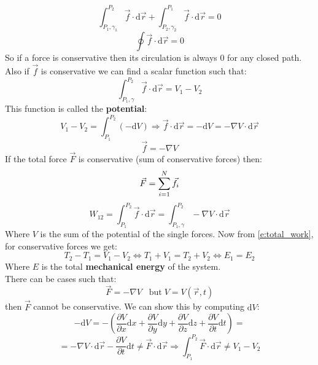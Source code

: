 \begin{equation}
    \int_{P_1,\gamma_1}^{P_2}\vec{f}\cdot\mathrm{d}\vec{r} + \int_{P_2,\gamma_2}^{P_1}\vec{f}\cdot\mathrm{d}\vec{r} = 0
\end{equation}
\begin{equation}
    \oint\vec{f}\cdot\mathrm{d}\vec{r} = 0
\end{equation}
So if a force is conservative then its circulation is always 0 for any closed path.\\
Also if $\vec{f}$ is conservative we can find a scalar function such that:
\begin{equation}
    \int_{P_1,\gamma}^{P_2}\vec{f}\cdot\mathrm{d}\vec{r} = V_1-V_2
\end{equation}
This function is called the \textbf{potential}:
\begin{equation}
    V_1-V_2 = \int_{P_1}^{P_2}(-\mathrm{d}V) \Rightarrow \vec{f}\cdot\mathrm{d}\vec{r} = -\mathrm{d}V = -\nabla V \cdot \mathrm{d}\vec{r}
\end{equation}
\begin{equation}
    \vec{f} = -\nabla V
\end{equation}
If the total force $\vec{F}$ is conservative (sum of conservative forces) then:
\begin{equation}
    \vec{F} = \displaystyle\sum_{i=1}^{N} \vec{f}_i
\end{equation}
\begin{equation}
    W_{12}=\int_{P_1}^{P_2}\vec{f}\cdot\mathrm{d}\vec{r} = \int_{P_1,\gamma}^{P_2}-\nabla V\cdot\mathrm{d}\vec{r}
\end{equation}
Where $V$ is the sum of the potential of the single forces. Now from \eqref{e:total_work}, for conservative forces we get:
\begin{equation} \label{e:mech_energy}
    T_2 - T_1 = V_1 - V_2 \iff T_1 + V_1 = T_2 + V_2\iff E_1 = E_2
\end{equation}
Where $E$ is the total \textbf{mechanical energy} of the system.\\
There can be cases such that:
\begin{equation}
    \vec{F} = -\nabla V \;\;\;\mathrm{but}\;V=V(\vec{r},t)
\end{equation}
then $\vec{F}$ cannot be conservative. We can show this by computing $\mathrm{d}V$:
\begin{equation}
    -\mathrm{d}V = -\left(\dfrac{\partial V}{\partial x}\mathrm{d}x + \dfrac{\partial V}{\partial y}\mathrm{d}y + \dfrac{\partial V}{\partial z}\mathrm{d}z + \dfrac{\partial V}{\partial t}\mathrm{d}t\right) =
\end{equation}
\begin{equation}
    = -\nabla V \cdot\mathrm{d}\vec{r} - \dfrac{\partial V}{\partial t}\mathrm{d}t \neq \vec{F}\cdot\mathrm{d}\vec{r} \Rightarrow \int_{P_1}^{P_2}\vec{F}\cdot\mathrm{d}\vec{r} \neq V_1-V_2
\end{equation}
